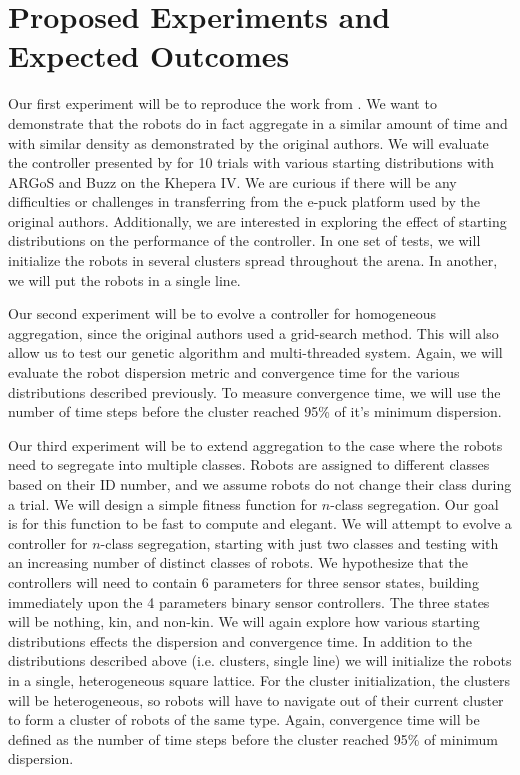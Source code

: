 \documentclass[conference]{IEEEtran}
\begin{document}
\section{Proposed Experiments and Expected Outcomes}

  Our first experiment will be to reproduce the work from \cite{gauci_self-organized_2014}. We want to demonstrate that the robots do in fact aggregate in a similar amount of time and with similar density as demonstrated by the original authors. We will evaluate the controller presented by \cite{gauci_self-organized_2014} for 10 trials with various starting distributions with ARGoS and Buzz on the Khepera IV. We are curious if there will be any difficulties or challenges in transferring from the e-puck platform used by the original authors. Additionally, we are interested in exploring the effect of starting distributions on the performance of the controller. In one set of tests, we will initialize the robots in several clusters spread throughout the arena. In another, we will put the robots in a single line.

  Our second experiment will be to evolve a controller for homogeneous aggregation, since the original authors used a grid-search method. This will also allow us to test our genetic algorithm and multi-threaded system. Again, we will evaluate the robot dispersion metric and convergence time for the various distributions described previously. To measure convergence time, we will use the number of time steps before the cluster reached 95\% of it's minimum dispersion.

  Our third experiment will be to extend aggregation to the case where the robots need to segregate into multiple classes. Robots are assigned to different classes based on their ID number, and we assume robots do not change their class during a trial. We will design a simple fitness function for $n$-class segregation. Our goal is for this function to be fast to compute and elegant. We will attempt to evolve a controller for $n$-class segregation, starting with just two classes and testing with an increasing number of distinct classes of robots. We hypothesize that the controllers will need to contain 6 parameters for three sensor states, building immediately upon the 4 parameters binary sensor controllers. The three states will be nothing, kin, and non-kin. We will again explore how various starting distributions effects the dispersion and convergence time. In addition to the distributions described above (i.e. clusters, single line) we will initialize the robots in a single, heterogeneous square lattice. For the cluster initialization, the clusters will be heterogeneous, so robots will have to navigate out of their current cluster to form a cluster of robots of the same type. Again, convergence time will be defined as the number of time steps before the cluster reached 95\% of minimum dispersion.
\end{document}
